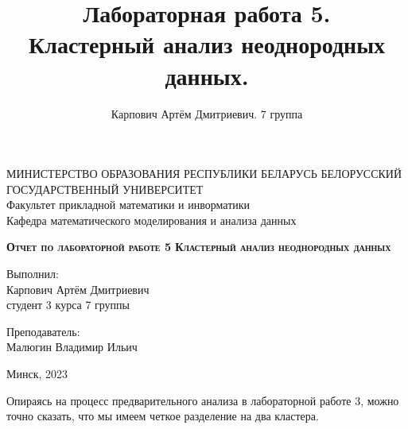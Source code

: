 \documentclass[11pt]{article}
\title{Лабораторная работа 5. \\ Кластерный анализ неоднородных данных.}
\author{Карпович Артём Дмитриевич. 7 группа}
\begin{document}
    
    \begin{titlepage}
    \newpage
    
    \begin{center}
    МИНИСТЕРСТВО ОБРАЗОВАНИЯ РЕСПУБЛИКИ БЕЛАРУСЬ БЕЛОРУССКИЙ ГОСУДАРСТВЕННЫЙ УНИВЕРСИТЕТ \\
    Факультет прикладной математики и инворматики \\ Кафедра математического моделирования и анализа данных 
    \end{center}
    
    \vspace{8em}
    
    \vspace{2em}
    
    \begin{center}
    \textsc{\textbf{Отчет по лабораторной работе 5 \linebreak Кластерный анализ неоднородных данных}}
    \end{center}
    
    \vspace{6em}
    
    \begin{flushright}
        Выполнил:\\
        Карпович Артём Дмитриевич\\
        студент 3 курса 7 группы
    \end{flushright}
    
    \begin{flushright}
        Преподаватель:\\
        Малюгин Владимир Ильич
    \end{flushright}
    
    \vspace{\fill}
    
    \begin{center}
    Минск, 2023
    \end{center}
    
    \end{titlepage}

Опираясь на процесс предварительного анализа в лабораторной работе 3,
можно точно сказать, что мы имеем четкое разделение на два кластера.
\end{document}
